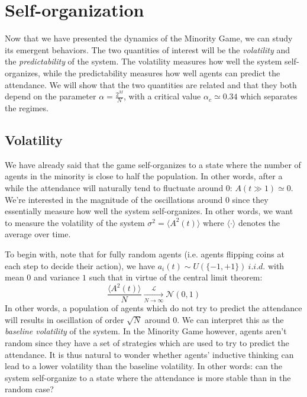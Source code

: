 \documentclass[a4paper, amsfonts, amssymb, amsmath, reprint, showkeys, nofootinbib, twoside]{revtex4-1}
\newcommand{\N}{\mathcal{N}}
\begin{document}
\section{Self-organization}
\label{sec:self-organization}

Now that we have presented the dynamics of the Minority Game, we can study its emergent behaviors. The two quantities of interest will be the \textit{volatility} and the \textit{predictability} of the system. The volatility measures how well the system self-organizes, while the predictability measures how well agents can predict the attendance. We will show that the two quantities are related and that they both depend on the parameter $\alpha = \frac{2^M}{N}$, with a critical value $\alpha_c \simeq 0.34$ which separates the regimes.

\subsection{Volatility}

We have already said that the game self-organizes to a state where the number of agents in the minority is close to half the population. In other words, after a while the attendance will naturally tend to fluctuate around $0$: $A(t \gg 1) \simeq 0$. We're interested in the magnitude of the oscillations around $0$ since they essentially measure how well the system self-organizes. In other words, we want to measure the volatility of the system $\sigma^2 = \langle A^2(t) \rangle$ where $\langle \cdot \rangle$ denotes the average over time.

To begin with, note that for fully random agents (i.e. agents flipping coins at each step to decide their action), we have $a_i(t) \sim U(\{-1, +1\}) \ i.i.d.$ with mean $0$ and variance $1$ such that in virtue of the central limit theorem:
\begin{equation}
    \frac{\langle A^2(t) \rangle}{N} \xrightarrow[N \to \infty]{\mathcal{L}} \N(0, 1)
\end{equation}
In other words, a population of agents which do not try to predict the attendance will results in oscillation of order $\sqrt{N}$ around $0$. We can interpret this as the \textit{baseline volatility} of the system. In the Minority Game however, agents aren't random since they have a set of strategies which are used to try to predict the attendance. It is thus natural to wonder whether agents' inductive thinking can lead to a lower volatility than the baseline volatility. In other words: can the system self-organize to a state where the attendance is more stable than in the random case?
\end{document}
